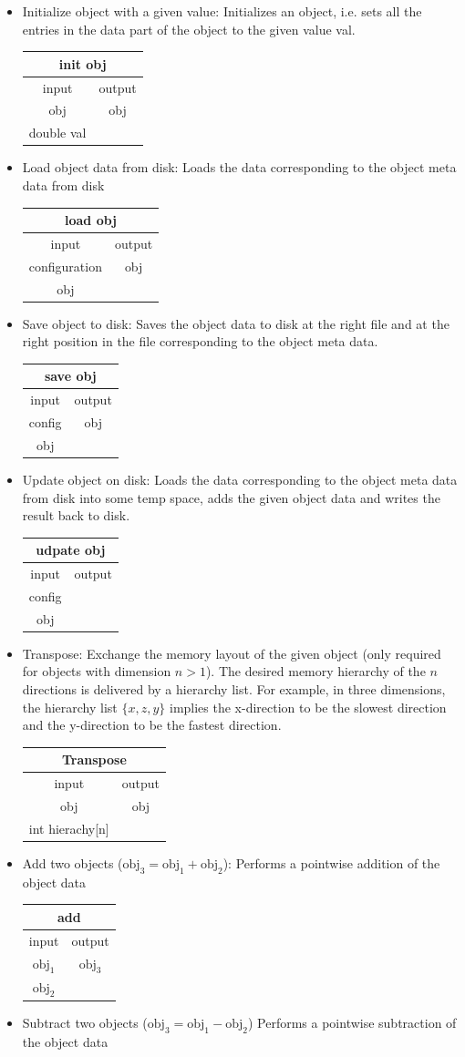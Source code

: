 \documentclass[12pt,a4paper]{article}
\newcommand{\bet}[1]{\begin{center}
		     \begin{tabular}{|c|c|}
		     \hline
		     \multicolumn{2}{|c|}{#1}\\
		     \hline\hline
		     input & output \\
                     \hline}
\newcommand{\eet}{\hline
		  \end{tabular}
		  \end{center}}
\begin{document}
\begin{itemize}
\item Initialize object with a given value:
\newline
Initializes an object, i.e. sets all the entries 
in the data part of the object to the given value val. 
\bet{init obj}
obj        & obj\\
double val &    \\
\eet
\item Load object data from disk:
\newline
Loads the data corresponding to the object meta data from disk
\bet{load obj}
configuration & obj \\
obj & \\
\eet
\item Save object to disk:
\newline
Saves the object data to disk at the right file and at the right 
position in the file corresponding to the object meta data.
\bet{save obj}
config & obj\\
obj & \\
\eet
\item Update object on disk:
\newline
Loads the data corresponding to the object meta data from disk into
some temp space, adds the given object data
and writes the result back to disk. 
\bet{udpate obj}
config & \\
obj &    \\
\eet
\item Transpose:
\newline
Exchange the memory layout of the given object (only required
for objects with dimension $n>1$). 
The desired memory hierarchy of the $n$ directions 
is delivered by a hierarchy list. For example, in three dimensions,
the hierarchy list $\{x,z,y\}$ implies the x-direction to 
be the slowest direction and the y-direction to be the 
fastest direction.  
\bet{Transpose}
obj & obj \\
int hierachy[n] & \\
\eet
\item Add two objects ($\mathrm{obj}_3 = \mathrm{obj}_1 + \mathrm{obj}_2$):
\newline
Performs a pointwise addition of the object data 
\bet{add}
$\mathrm{obj}_1$ & $\mathrm{obj}_3$\\
$\mathrm{obj}_2$ & \\
\eet
\item Subtract two objects ($\mathrm{obj}_3 = \mathrm{obj}_1 - \mathrm{obj}_2$)
\newline
Performs a pointwise subtraction of the object data 

\end{itemize}
\end{document}
